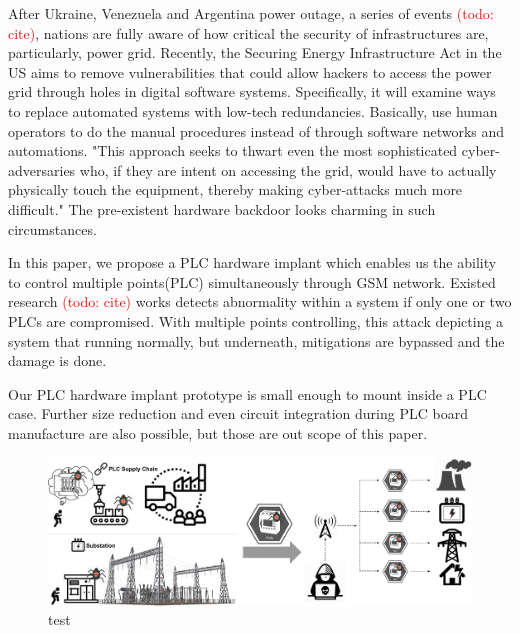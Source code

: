 After Ukraine, Venezuela and Argentina power outage, a series of events \textcolor{red}{(todo: cite)}, nations are fully aware of how critical the security of infrastructures are, particularly, power grid. Recently, the Securing Energy Infrastructure Act in the US aims to remove vulnerabilities that could allow hackers to access the power grid through holes in digital software systems. Specifically, it will examine ways to replace automated systems with low-tech redundancies. Basically, use human operators to do the manual procedures instead of through software networks and automations. "This approach seeks to thwart even the most sophisticated cyber-adversaries who, if they are intent on accessing the grid, would have to actually physically touch the equipment, thereby making cyber-attacks much more difficult." The pre-existent hardware backdoor looks charming in such circumstances.

In this paper, we propose a PLC hardware implant which enables us the ability to control multiple points(PLC) simultaneously through GSM network. Existed research \textcolor{red}{(todo: cite)} works detects abnormality within a system if only one or two PLCs are compromised. With multiple points controlling, this attack depicting a system that running normally, but underneath, mitigations are bypassed and the damage is done.

Our PLC hardware implant prototype is small enough to mount inside a PLC case. Further size reduction and even circuit integration during PLC board manufacture are also possible, but those are out scope of this paper.

\begin{figure}[tp]
	\includegraphics[width=\textwidth]{figures/bigpic}
	\centering
	\caption{test}
	\label{fig:bigpic}
\end{figure}

